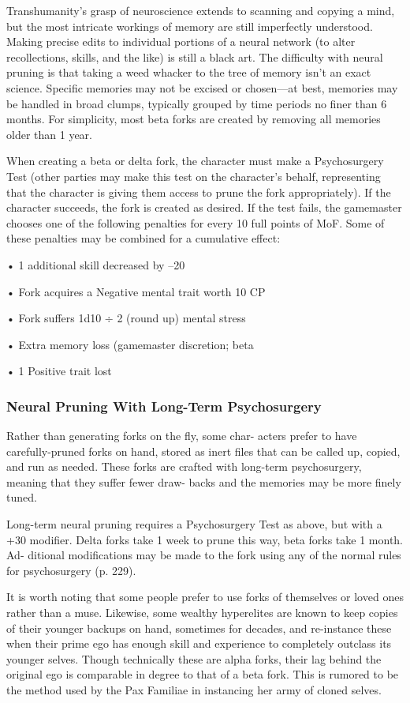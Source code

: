 Transhumanity's grasp of neuroscience extends to 
scanning and copying a mind, but the most intricate 
workings of memory are still imperfectly understood. 
Making precise edits to individual portions of a neural 
network (to alter recollections, skills, and the like) is 
still a black art. The difficulty with neural pruning is 
that taking a weed whacker to the tree of memory 
isn't an exact science. Specific memories may not be 
excised or chosen—at best, memories may be handled 
in broad clumps, typically grouped by time periods no 
finer than 6 months. For simplicity, most beta forks are 
created by removing all memories older than 1 year.

When creating a beta or delta fork, the character 
must make a Psychosurgery Test (other parties may 
make this test on the character's behalf, representing 
that the character is giving them access to prune the 
fork appropriately). If the character succeeds, the fork 
is created as desired. If the test fails, the gamemaster 
chooses one of the following penalties for every 10 
full points of MoF. Some of these penalties may be 
combined for a cumulative effect:

•  1 additional skill decreased by –20

•  Fork acquires a Negative mental trait worth 10 CP

•  Fork suffers 1d10 ÷ 2 (round up) mental stress

•  Extra memory loss (gamemaster discretion; beta 

•  1 Positive trait lost

\subsubsection{Neural Pruning With Long-Term Psychosurgery}

Rather than generating forks on the fly, some char-
acters prefer to have carefully-pruned forks on hand, 
stored as inert files that can be called up, copied, and 
run as needed. These forks are crafted with long-term 
psychosurgery, meaning that they suffer fewer draw-
backs and the memories may be more finely tuned.

Long-term neural pruning requires a Psychosurgery 
Test as above, but with a +30 modifier. Delta forks take 
1 week to prune this way, beta forks take 1 month. Ad-
ditional modifications may be made to the fork using 
any of the normal rules for psychosurgery (p. 229).

It is worth noting that some people prefer to use 
forks of themselves or loved ones rather than a muse. 
Likewise, some wealthy hyperelites are known to keep 
copies of their younger backups on hand, sometimes 
for decades, and re-instance these when their prime 
ego has enough skill and experience to completely 
outclass its younger selves. Though technically these 
are alpha forks, their lag behind the original ego is 
comparable in degree to that of a beta fork. This is 
rumored to be the method used by the Pax Familiae 
in instancing her army of cloned selves.


